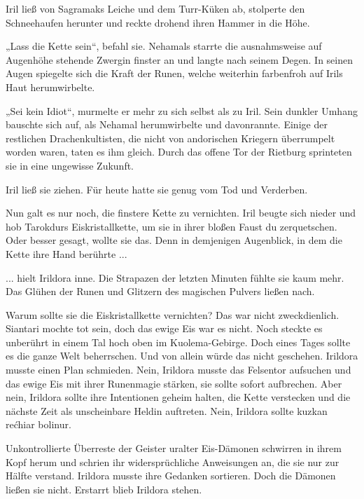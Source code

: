 Iril ließ von Sagramaks Leiche und dem Turr-Küken ab, stolperte den Schneehaufen herunter und reckte drohend ihren Hammer in die Höhe.

„Lass die Kette sein“, befahl sie. Nehamals starrte die ausnahmsweise auf Augenhöhe stehende Zwergin finster an und langte nach seinem Degen. In seinen Augen spiegelte sich die Kraft der Runen, welche weiterhin farbenfroh auf Irils Haut herumwirbelte.

„Sei kein Idiot“, murmelte er mehr zu sich selbst als zu Iril. Sein dunkler Umhang bauschte sich auf, als Nehamal herumwirbelte und davonrannte. Einige der restlichen Drachenkultisten, die nicht von andorischen Kriegern überrumpelt worden waren, taten es ihm gleich. Durch das offene Tor der Rietburg sprinteten sie in eine ungewisse Zukunft.

Iril ließ sie ziehen. Für heute hatte sie genug vom Tod und Verderben.

Nun galt es nur noch, die finstere Kette zu vernichten. Iril beugte sich nieder und hob Tarokdurs Eiskristallkette, um sie in ihrer bloßen Faust du zerquetschen. Oder besser gesagt, wollte sie das. Denn in demjenigen Augenblick, in dem die Kette ihre Hand berührte ...\bigskip







... hielt Irildora inne. Die Strapazen der letzten Minuten fühlte sie kaum mehr. Das Glühen der Runen und Glitzern des magischen Pulvers ließen nach.

Warum sollte sie die Eiskristallkette vernichten? Das war nicht zweckdienlich. Siantari mochte tot sein, doch das ewige Eis war es nicht. Noch steckte es unberührt in einem Tal hoch oben im Kuolema-Gebirge. Doch eines Tages sollte es die ganze Welt beherrschen. Und von allein würde das nicht geschehen. Irildora musste einen Plan schmieden. Nein, Irildora musste das Felsentor aufsuchen und das ewige Eis mit ihrer Runenmagie stärken, sie sollte sofort aufbrechen. Aber nein, Irildora sollte ihre Intentionen geheim halten, die Kette verstecken und die nächste Zeit als unscheinbare Heldin auftreten. Nein, Irildora sollte kuzkan rećhiar bolinur.

Unkontrollierte Überreste der Geister uralter Eis-Dämonen schwirren in ihrem Kopf herum und schrien ihr widersprüchliche Anweisungen an, die sie nur zur Hälfte verstand. Irildora musste ihre Gedanken sortieren. Doch die Dämonen ließen sie nicht. Erstarrt blieb Irildora stehen.\bigskip







